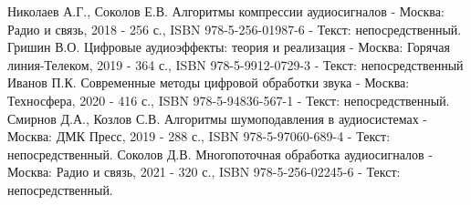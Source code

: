\begin{thebibliography}{9}
	 Николаев А.Г., Соколов Е.В. Алгоритмы компрессии аудиосигналов - Москва: Радио и связь, 2018 - 256 с., ISBN 978-5-256-01987-6 - Текст: непосредственный.
	 Гришин В.О. Цифровые аудиоэффекты: теория и реализация - Москва: Горячая линия-Телеком, 2019 - 364 с., ISBN 978-5-9912-0729-3 - Текст: непосредственный
	 Иванов П.К. Современные методы цифровой обработки звука - Москва: Техносфера, 2020 - 416 с., ISBN 978-5-94836-567-1 - Текст: непосредственный.
	 Смирнов Д.А., Козлов С.В. Алгоритмы шумоподавления в аудиосистемах - Москва: ДМК Пресс, 2019 - 288 с., ISBN 978-5-97060-689-4 - Текст: непосредственный.
	 Соколов Д.В. Многопоточная обработка аудиосигналов - Москва: Радио и связь, 2021 - 320 с., ISBN 978-5-256-02245-6 - Текст: непосредственный.
	
\end{thebibliography}
